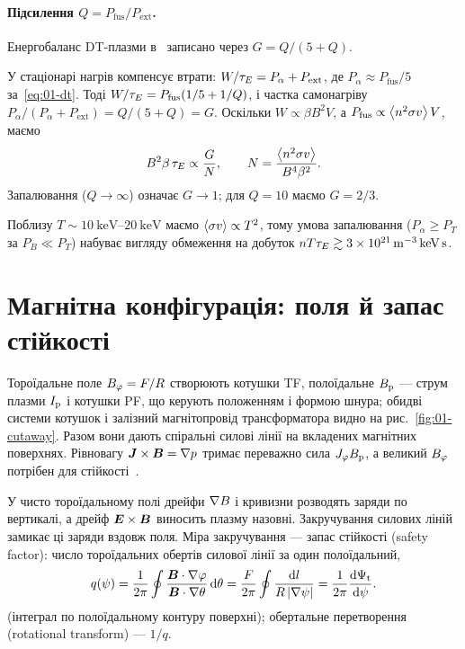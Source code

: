 \paragraph{Підсилення $Q=P_{\mathrm{fus}}/P_{\mathrm{ext}}$.} Енергобаланс DT-плазми
в~\cite{Mazzucato2000} записано через $G=Q/(5+Q)$.
\begin{derivation}[звідки береться $G=Q/(5+Q)$]
У стаціонарі нагрів компенсує втрати: $W/\tau_{E}=P_\alpha+P_{\mathrm{ext}}$, де
$P_\alpha\approx P_{\mathrm{fus}}/5$ за~\eqref{eq:01-dt}. Тоді
$W/\tau_{E}=P_{\mathrm{fus}}(1/5+1/Q)$, і частка самонагріву
$P_\alpha/(P_\alpha+P_{\mathrm{ext}})=Q/(5+Q)=G$. Оскільки $W\propto\beta B^{2}V$,
а $P_{\mathrm{fus}}\propto\left\langle n^{2}\sigma v \right\rangle V$, маємо~\cite{Mazzucato2000}
\begin{equation}\label{eq:01-G}
  B^{2}\beta\,\tau_{E}\propto\frac{G}{N},\qquad N=\frac{\left\langle n^{2}\sigma v \right\rangle}{B^{4}\beta^{2}} .
\end{equation}
Запалювання ($Q\to\infty$) означає $G\to1$; для $Q=10$ маємо $G=2/3$.
\end{derivation}

\begin{outofcorpus}
Поблизу $T\sim\SIrange{10}{20}{\kilo\electronvolt}$ маємо $\left\langle \sigma v \right\rangle\propto T^{2}$, тому
умова запалювання ($P_\alpha\ge P_T$ за $P_B\ll P_T$) набуває вигляду обмеження на добуток
$nT\tau_{E}\gtrsim\SI{3e21}{\per\cubic\metre\kilo\electronvolt\second}$.
\end{outofcorpus}

\section{Магнітна конфігурація: поля й запас стійкості}\label{sec:01-q}

Тороїдальне поле $B_{\varphi}=F/R$ створюють котушки TF, полоїдальне $B_{\mathrm{p}}$ --- струм плазми
$I_{\mathrm{p}}$ і котушки PF, що керують положенням і формою шнура; обидві системи котушок і
залізний магнітопровід трансформатора видно на рис.~\ref{fig:01-cutaway}.
Разом вони дають спіральні силові лінії на вкладених магнітних поверхнях. Рівновагу
$\bm{J}\times\bm{B}=\nabla p$ тримає переважно сила $J_{\varphi}B_{\mathrm{p}}$, а великий $B_{\varphi}$
потрібен для стійкості~\cite{Merlo2011}.

\begin{outofcorpus}
У чисто тороїдальному полі дрейфи $\nabla B$ і кривизни розводять заряди по вертикалі,
а дрейф $\bm{E}\times\bm{B}$ виносить плазму назовні. Закручування силових ліній замикає ці заряди
вздовж поля. Міра закручування --- запас стійкості (safety factor): число тороїдальних
обертів силової лінії за один полоїдальний,
\begin{equation}\label{eq:01-qdef}
  q(\psi)=\frac{1}{2\pi}\oint\frac{\bm{B}\cdot\nabla\varphi}{\bm{B}\cdot\nabla\theta}\,\mathrm{d}\theta
  =\frac{F}{2\pi}\oint\frac{\mathrm{d} l}{R\,|\nabla\psi|}=\frac{1}{2\pi}\frac{\mathrm{d}\Psi_{\mathrm{t}}}{\mathrm{d}\psi}.
\end{equation}
(інтеграл по полоїдальному контуру поверхні); обертальне перетворення (rotational transform) --- $1/q$.
\end{outofcorpus}


